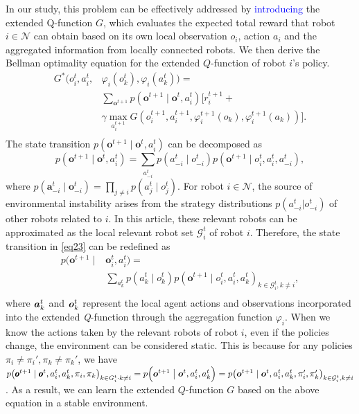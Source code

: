 \documentclass[lettersize,journal]{IEEEtran}
\newcommand{\blue}[1]{\textcolor{blue}{#1}}
\begin{document}
In our study, this problem can be effectively addressed by \blue{introducing} the extended Q-function $G$, which evaluates the expected total reward that robot $i\in\mathcal{N}$ can obtain based on its own local observation $o_{i}$, action $a_{i}$ and the aggregated information from locally connected robots. We then derive the Bellman optimality equation for the extended $Q$-function of robot $i$'s policy.
\begin{equation} 
    \begin{aligned}
        G^*(o_i^t,a_i^t, & \varphi_i(o_k^t),\varphi_i(a_k^t))= \\
        &\sum_{\pmb o^{t+1}}p(\pmb o^{t+1}\mid \pmb o^t,a_i^t)[r_i^{t+1}+\\
        &\gamma\max\limits_{a_i^{t+1}}G(o_i^{t+1},a_i^{t+1},\varphi_i^{t+1}(o_k),\varphi_i^{t+1}(a_k))].\\
    \end{aligned}\label{eq22}
\end{equation}
The state transition $p(\pmb{o}^{t+1}\mid\pmb{o}^{t},a_{i}^{t})$ can be decomposed as  
\begin{equation} 
    p(\pmb o^{t+1}\mid \pmb o^t,a_i^t)=\sum_{a_{-i}^t}p(a_{-i}^t\mid o_{-i}^t)p(\pmb o^{t+1}\mid o_i^t,a_i^t,a_{-i}^t),\label{eq23}
\end{equation}
where $p(\boldsymbol{a}_{-i}^t\mid\boldsymbol{o}_{-i}^t)=\prod_{j\neq i}p({a}_{j}^t\mid {o}_{j}^t)$. For robot $i\in\mathcal{N}$, the source of environmental instability arises from the strategy distributions $p\left(a_{-i}^{t}|o_{-i}^{t}\right)$ of other robots related to $i$. In this article, these relevant robots can be approximated as the local relevant robot set $\mathcal{G}_i^{t}$ of robot $i$. Therefore, the state transition in \eqref{eq23} can be redefined as 
\begin{equation} 
    \begin{aligned}
        p(\pmb o^{t+1}\mid & \pmb o_i^t,a_i^t)=\\
        &\sum_{a_k^t}p(a_k^t\mid o_k^t)p(\pmb o^{t+1}\mid o_i^t,a_i^t,a_k^t)_{k\in\mathcal{G}_i^t,k\neq i},\\
    \end{aligned}\label{eq24}
\end{equation}
where $\textbf{\textit{a}}_{k}^{t}$ and $\textbf{\textit{o}}_{k}^{t}$  represent the local agent actions and observations incorporated into the extended \textit{Q}-function through the aggregation function $\varphi_{i}$. When we know the actions taken by the relevant robots of robot $i$, even if the policies change, the environment can be considered static. This is because for any policies $\pi_i\neq\pi_i',\pi_k\neq\pi_k'$, we have $p\big(\pmb o^{t+1}\mid \pmb o^t,a_i^t,a_k^t,\pi_i,\pi_k\big)_{k\in G_i^t\cdot k\neq i}=p\Big(\boldsymbol{o}^{t+1}\bigm|\boldsymbol{o}^{t},a_{i}^{t},a_{k}^{t}\Big)=p\big(\boldsymbol{o}^{t+1}\mid\boldsymbol{o}^{t},a_{i}^{t},a_{k}^{t},\pi_{i}^{\prime},\pi_{k}^{\prime}\big)_{k\in{\cal G}_{i}^{t},k\neq i}$. As a result, we can learn the extended $Q$-function $G$ based on the above equation in a stable environment.
\end{document}
